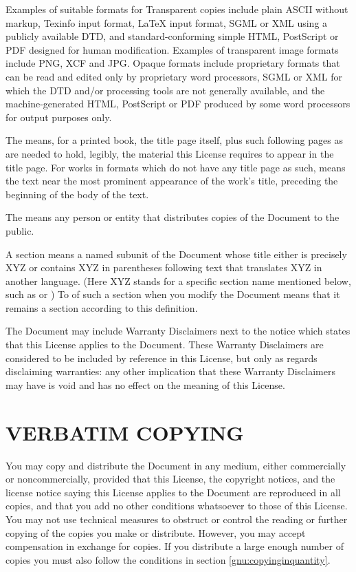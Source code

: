 Examples of suitable formats for Transparent copies include
plain ASCII without markup, Texinfo input format, LaTeX
input format, SGML or XML using a publicly available DTD, and
standard-conforming simple HTML, PostScript or PDF designed
for human modification. Examples of transparent image formats
include PNG, XCF and JPG. Opaque formats include proprietary
formats that can be read and edited only by proprietary word
processors, SGML or XML for which the DTD and/or processing
tools are not generally available, and the machine-generated
HTML, PostScript or PDF produced by some word processors for
output purposes only.

The  means, for a printed book, the title
page itself, plus such following pages as are needed to hold,
legibly, the material this License requires to appear in the
title page. For works in formats which do not have any title
page as such,  means the text near the most
prominent appearance of the work\textquoteright s title, preceding the
beginning of the body of the text.

The  means any person or entity that distributes
copies of the Document to the public.

A section  means a named subunit of the
Document whose title either is precisely XYZ or contains
XYZ in parentheses following text that translates XYZ in
another language. (Here XYZ stands for a specific section
name mentioned below, such as 
  or ) To
 of such a section when you modify
the Document means that it remains a section  according to this definition.

The Document may include Warranty Disclaimers next to
the notice which states that this License applies to the
Document. These Warranty Disclaimers are considered to be
included by reference in this License, but only as regards
disclaiming warranties: any other implication that these
Warranty Disclaimers may have is void and has no effect on
the meaning of this License.

\section{VERBATIM COPYING}
\label{gnu:verbatimcopying}
You may copy and distribute the Document in any medium, either
commercially or noncommercially, provided that this License,
the copyright notices, and the license notice saying this
License applies to the Document are reproduced in all copies,
and that you add no other conditions whatsoever to those of
this License. You may not use technical measures to obstruct
or control the reading or further copying of the copies you
make or distribute. However, you may accept compensation in
exchange for copies. If you distribute a large enough number
of copies you must also follow the conditions in 
section \ref{gnu:copyinginquantity}.

